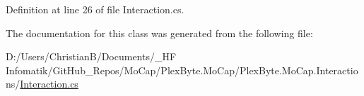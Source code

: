 Definition at line 26 of file Interaction.\+cs.



The documentation for this class was generated from the following file\+:\begin{DoxyCompactItemize}
\item 
D\+:/\+Users/\+Christian\+B/\+Documents/\+\_\+\+H\+F Infomatik/\+Git\+Hub\+\_\+\+Repos/\+Mo\+Cap/\+Plex\+Byte.\+Mo\+Cap/\+Plex\+Byte.\+Mo\+Cap.\+Interactions/\hyperlink{_interaction_8cs}{Interaction.\+cs}\end{DoxyCompactItemize}
